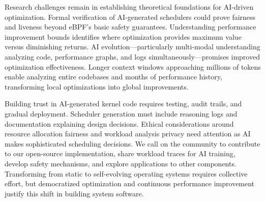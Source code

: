 Research challenges remain in establishing theoretical foundations for AI-driven optimization. Formal verification of AI-generated schedulers could prove fairness and liveness beyond eBPF's basic safety guarantees. Understanding performance improvement bounds identifies where optimization provides maximum value versus diminishing returns. AI evolution—particularly multi-modal understanding analyzing code, performance graphs, and logs simultaneously—promises improved optimization effectiveness. Longer context windows approaching millions of tokens enable analyzing entire codebases and months of performance history, transforming local optimizations into global improvements.

Building trust in AI-generated kernel code requires testing, audit trails, and gradual deployment. Scheduler generation must include reasoning logs and documentation explaining design decisions. Ethical considerations around resource allocation fairness and workload analysis privacy need attention as AI makes sophisticated scheduling decisions. We call on the community to contribute to our open-source implementation, share workload traces for AI training, develop safety mechanisms, and explore applications to other components. Transforming from static to self-evolving operating systems requires collective effort, but democratized optimization and continuous performance improvement justify this shift in building system software.